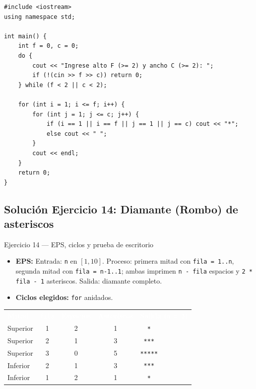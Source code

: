 \documentclass[11pt,letterpaper]{article}
\begin{document}
\begin{lstlisting}[style=cppmonitoria,caption={Solución Ejercicio 13: Marco rectangular hueco (C++)}]
#include <iostream>
using namespace std;

int main() {
    int f = 0, c = 0;
    do {
        cout << "Ingrese alto F (>= 2) y ancho C (>= 2): ";
        if (!(cin >> f >> c)) return 0;
    } while (f < 2 || c < 2);

    for (int i = 1; i <= f; i++) {
        for (int j = 1; j <= c; j++) {
            if (i == 1 || i == f || j == 1 || j == c) cout << "*";
            else cout << " ";
        }
        cout << endl;
    }
    return 0;
}
\end{lstlisting}

\subsection{Solución Ejercicio 14: Diamante (Rombo) de asteriscos}

\begin{solucion}{Ejercicio 14 --- EPS, ciclos y prueba de escritorio}
\begin{itemize}
  \item \textbf{EPS:} Entrada: \texttt{n} en $[1, 10]$. Proceso: primera mitad con \texttt{fila = 1..n}, segunda mitad con \texttt{fila = n-1..1}; ambas imprimen \texttt{n - fila} espacios y \texttt{2 * fila - 1} asteriscos. Salida: diamante completo.
  \item \textbf{Ciclos elegidos:} \texttt{for} anidados.
\end{itemize}
\begin{center}
\footnotesize
\renewcommand{\arraystretch}{1.15}
\begin{tabularx}{0.85\linewidth}{l c c c X}
\rowcolor{AzulMarino}
\textcolor{white}{\textbf{Mitad}} & \textcolor{white}{\texttt{fila}} & \textcolor{white}{\textbf{Espacios}} & \textcolor{white}{\textbf{Asteriscos}} & \textcolor{white}{\textbf{Salida (\texttt{n = 3})}} \\
Superior & 1 & 2 & 1 & \texttt{\ \ *} \\
Superior & 2 & 1 & 3 & \texttt{\ ***} \\
Superior & 3 & 0 & 5 & \texttt{*****} \\
Inferior & 2 & 1 & 3 & \texttt{\ ***} \\
Inferior & 1 & 2 & 1 & \texttt{\ \ *} \\
\bottomrule
\end{tabularx}
\end{center}
\end{solucion}
\end{document}
